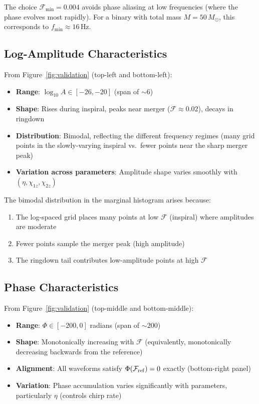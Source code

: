 \documentclass[11pt,a4paper]{article}
\newcommand{\Mf}{\mathcal{F}}
\begin{document}
The choice $\Mf_{\min} = 0.004$ avoids phase aliasing at low frequencies (where the phase evolves most rapidly). For a binary with total mass $M = 50\,M_\odot$, this corresponds to $f_{\min} \approx 16\,$Hz.

\subsection{Log-Amplitude Characteristics}

From Figure~\ref{fig:validation} (top-left and bottom-left):
\begin{itemize}
    \item \textbf{Range}: $\log_{10} A \in [-26, -20]$ (span of $\sim 6$)
    \item \textbf{Shape}: Rises during inspiral, peaks near merger ($\Mf \approx 0.02$), decays in ringdown
    \item \textbf{Distribution}: Bimodal, reflecting the different frequency regimes (many grid points in the slowly-varying inspiral vs.\ fewer points near the sharp merger peak)
    \item \textbf{Variation across parameters}: Amplitude shape varies smoothly with $(\eta, \chi_{1z}, \chi_{2z})$
\end{itemize}

The bimodal distribution in the marginal histogram arises because:
\begin{enumerate}
    \item The log-spaced grid places many points at low $\Mf$ (inspiral) where amplitudes are moderate
    \item Fewer points sample the merger peak (high amplitude)
    \item The ringdown tail contributes low-amplitude points at high $\Mf$
\end{enumerate}

\subsection{Phase Characteristics}

From Figure~\ref{fig:validation} (top-middle and bottom-middle):
\begin{itemize}
    \item \textbf{Range}: $\Phi \in [-200, 0]$ radians (span of $\sim 200$)
    \item \textbf{Shape}: Monotonically increasing with $\Mf$ (equivalently, monotonically decreasing backwards from the reference)
    \item \textbf{Alignment}: All waveforms satisfy $\Phi(\Mf_{\rm ref}) = 0$ exactly (bottom-right panel)
    \item \textbf{Variation}: Phase accumulation varies significantly with parameters, particularly $\eta$ (controls chirp rate)
\end{itemize}
\end{document}
